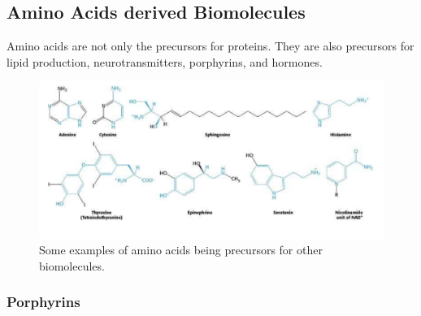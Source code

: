 \documentclass[../main.tex]{subfiles}
\begin{document}
\begin{figure}[H]
	\centering
	\hfill
	\caption{}
\end{figure}

\subsection{Amino Acids derived Biomolecules}

Amino acids are not only the precursors for proteins. They are also precursors for lipid production, neurotransmitters, porphyrins, and hormones. 

\begin{figure}[H]
	\centering
	\includegraphics[width=0.5\linewidth]{aa_derivates_ex}
	\caption{Some examples of amino acids being precursors for other biomolecules.}
	\label{fig:aaderivatesex}
\end{figure}


\subsubsection{Porphyrins}
\end{document}
